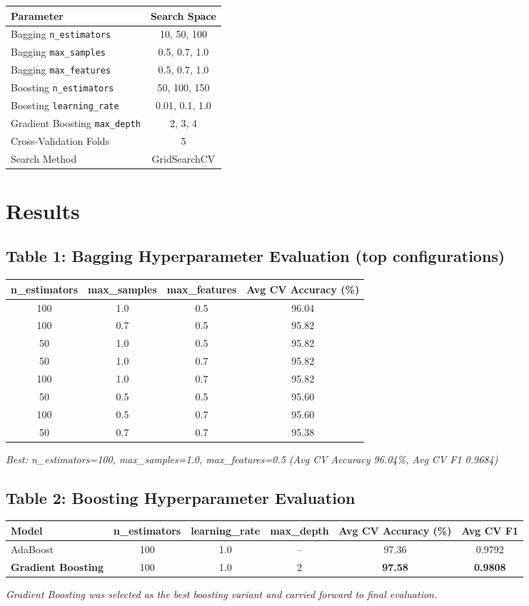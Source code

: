 \documentclass[12pt,a4paper]{article}
\begin{document}
\begin{longtable}{lc}
\toprule
Parameter & Search Space\\
\midrule
Bagging \texttt{n\_estimators} & 10, 50, 100 \\
Bagging \texttt{max\_samples} & 0.5, 0.7, 1.0 \\
Bagging \texttt{max\_features} & 0.5, 0.7, 1.0 \\
Boosting \texttt{n\_estimators} & 50, 100, 150 \\
Boosting \texttt{learning\_rate} & 0.01, 0.1, 1.0 \\
Gradient Boosting \texttt{max\_depth} & 2, 3, 4 \\
Cross-Validation Folds & 5 \\
Search Method & GridSearchCV \\
\bottomrule
\end{longtable}

\section{Results}

\subsection*{Table 1: Bagging Hyperparameter Evaluation (top configurations)}
\begin{longtable}{cccc}
\toprule
n\_estimators & max\_samples & max\_features & Avg CV Accuracy (\%)\\
\midrule
100 & 1.0 & 0.5 & 96.04 \\
100 & 0.7 & 0.5 & 95.82 \\
50  & 1.0 & 0.5 & 95.82 \\
50  & 1.0 & 0.7 & 95.82 \\
100 & 1.0 & 0.7 & 95.82 \\
50  & 0.5 & 0.5 & 95.60 \\
100 & 0.5 & 0.7 & 95.60 \\
50  & 0.7 & 0.7 & 95.38 \\
\bottomrule
\end{longtable}
\textit{Best: n\_estimators=100, max\_samples=1.0, max\_features=0.5 (Avg CV Accuracy
96.04\%, Avg CV F1 0.9684)}

\subsection*{Table 2: Boosting Hyperparameter Evaluation}
\begin{longtable}{lccccc}
\toprule
Model & n\_estimators & learning\_rate & max\_depth & Avg CV Accuracy (\%) & Avg CV F1\\
\midrule
AdaBoost & 100 & 1.0 & -- & 97.36 & 0.9792 \\
\textbf{Gradient Boosting} & 100 & 1.0 & 2 & \textbf{97.58} & \textbf{0.9808} \\
\bottomrule
\end{longtable}
\textit{Gradient Boosting was selected as the best boosting variant and carried
forward to final evaluation.}
\end{document}
